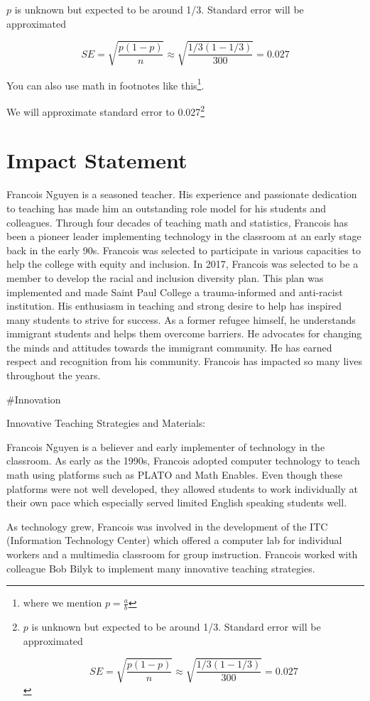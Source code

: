 \documentclass[
]{book}
\begin{document}
\(p\) is unknown but expected to be around 1/3. Standard error will be approximated

\[
SE = \sqrt{\frac{p(1-p)}{n}} \approx \sqrt{\frac{1/3 (1 - 1/3)} {300}} = 0.027
\]

You can also use math in footnotes like this\footnote{where we mention \(p = \frac{a}{b}\)}.

We will approximate standard error to 0.027\footnote{\(p\) is unknown but expected to be around 1/3. Standard error will be approximated

  \[
  SE = \sqrt{\frac{p(1-p)}{n}} \approx \sqrt{\frac{1/3 (1 - 1/3)} {300}} = 0.027
  \]}

\chapter{Impact Statement}\label{impact-statement}

Francois Nguyen is a seasoned teacher. His experience and passionate dedication to teaching has made him an outstanding role model for his students and colleagues. Through four decades of teaching math and statistics, Francois has been a pioneer leader implementing technology in the classroom at an early stage back in the early 90s. Francois was selected to participate in various capacities to help the college with equity and inclusion. In 2017, Francois was selected to be a member to develop the racial and inclusion diversity plan. This plan was implemented and made Saint Paul College a trauma-informed and anti-racist institution. His enthusiasm in teaching and strong desire to help has inspired many students to strive for success. As a former refugee himself, he understands immigrant students and helps them overcome barriers. He advocates for changing the minds and attitudes towards the immigrant community. He has earned respect and recognition from his community. Francois has impacted so many lives throughout the years.

\#Innovation

Innovative Teaching Strategies and Materials:

Francois Nguyen is a believer and early implementer of technology in the classroom. As early as the 1990s, Francois adopted computer technology to teach math using platforms such as PLATO and Math Enables. Even though these platforms were not well developed, they allowed students to work individually at their own pace which especially served limited English speaking students well.

As technology grew, Francois was involved in the development of the ITC (Information Technology Center) which offered a computer lab for individual workers and a multimedia classroom for group instruction. Francois worked with colleague Bob Bilyk to implement many innovative teaching strategies.
\end{document}
